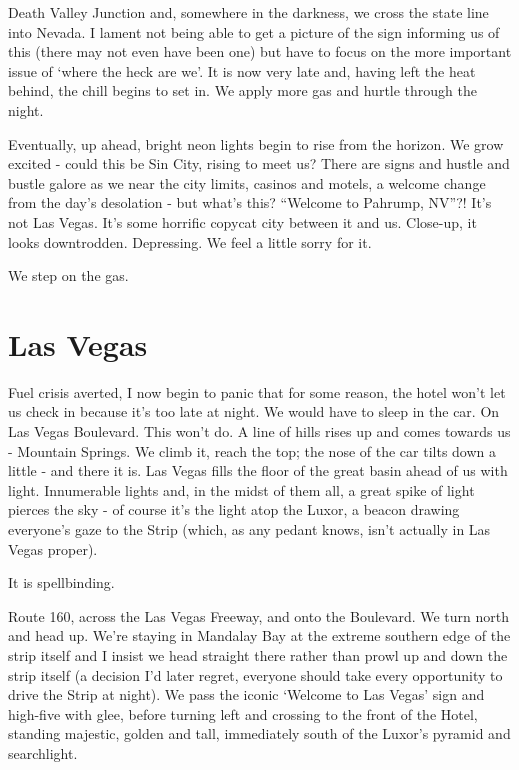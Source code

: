 \documentclass[a5paper,titlepage,11pt,draft]{book}
\begin{document}
Death Valley Junction and, somewhere in the darkness, we cross the state line into Nevada.  I lament not being able to get a picture of the sign informing us of this (there may not even have been one) but have to focus on the more important issue of `where the heck are we'.  It is now very late and, having left the heat behind, the chill begins to set in.  We apply more gas and hurtle through the night.

Eventually, up ahead, bright neon lights begin to rise from the horizon.  We grow excited - could this be Sin City, rising to meet us?  There are signs and hustle and bustle galore as we near the city limits, casinos and motels, a welcome change from the day's desolation - but what's this?  ``Welcome to Pahrump, NV''?!  It's not Las Vegas.  It's some horrific copycat city between it and us.  Close-up, it looks downtrodden.  Depressing.  We feel a little sorry for it.

We step on the gas.

\section*{Las Vegas}
Fuel crisis averted, I now begin to panic that for some reason, the hotel won't let us check in because it's too late at night.  We would have to sleep in the car.  On Las Vegas Boulevard.  This won't do.  A line of hills rises up and comes towards us - Mountain Springs.  We climb it, reach the top; the nose of the car tilts down a little - and there it is.  Las Vegas fills the floor of the great basin ahead of us with light.  Innumerable lights and, in the midst of them all, a great spike of light pierces the sky - of course it's the light atop the Luxor, a beacon drawing everyone's gaze to the Strip (which, as any pedant knows, isn't actually in Las Vegas proper).

It is spellbinding.

Route 160, across the Las Vegas Freeway, and onto the Boulevard.  We turn north and head up.  We're staying in Mandalay Bay at the extreme southern edge of the strip itself and I insist we head straight there rather than prowl up and down the strip itself (a decision I'd later regret, everyone should take every opportunity to drive the Strip at night).  We pass the iconic `Welcome to Las Vegas' sign and high-five with glee, before turning left and crossing to the front of the Hotel, standing majestic, golden and tall, immediately south of the Luxor's pyramid and searchlight.
\end{document}
